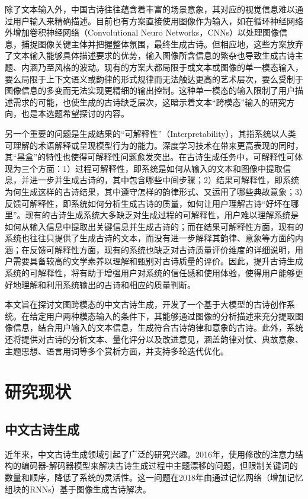 除了文本输入外，中国古诗往往蕴含着丰富的场景意象，其对应的视觉信息难以通过用户输入来精确描述。目前也有方案直接使用图像作为输入，如在循环神经网络外增加卷积神经网络（Convolutional Neuro Networks，CNNs）以处理图像信息，捕捉图像关键主体并把握整体氛围，最终生成古诗。\cite{liuImages2PoemGeneratingChinese2018}\cite{xuHowImagesInspire2018}但相应地，这些方案放弃了文本输入能够具体描述要求的优势，输入图像所含信息的繁杂也导致生成古诗主题、内涵乃至风格的波动。现有的方案大都局限于或文本或图像的单一模态输入，要么局限于上下文语义或韵律的形式规律而无法触达更高的艺术层次，要么受制于图像信息的多变而无法实现更精细的输出控制。这种单一模态的输入限制了用户描述需求的可能，也使生成的古诗缺乏层次，这暗示着文本“跨模态”输入的研究方向，也是本选题希望探讨的内容。

另一个重要的问题是生成结果的“可解释性”（Interpretability），其指系统以人类可理解的术语解释或呈现模型行为的能力。\cite{doshi-velezRigorousScienceInterpretable2017}深度学习技术在带来更高表现的同时，其“黑盒”的特性也使得可解释性问题愈发突出。在古诗生成任务中，可解释性可体现为三个方面：1）过程可解释性，即系统是如何从输入的文本和图像中提取信息，并进一步并生成古诗的，其中包含哪些中间步骤；2）结果可解释性，即系统为何生成这样的古诗结果，其中遵守怎样的韵律形式、又运用了哪些典故意象；3）反馈可解释性，即系统如何分析生成古诗的质量，如何让用户理解古诗“好坏在哪里”。现有的古诗生成系统大多缺乏对生成过程的可解释性，用户难以理解系统是如何从输入信息中提取出关键信息并生成古诗的；而在结果可解释性方面，现有的系统也往往只提供了生成古诗的文本，而没有进一步解释其韵律、意象等方面的内涵；在反馈可解释性方面，现有的系统也缺乏对古诗质量评价维度的详细说明，用户需要具备较高的文学素养以理解和甄别对古诗质量的评价。因此，提升古诗生成系统的可解释性，将有助于增强用户对系统的信任感和使用体验，使得用户能够更好地理解和利用系统输出的古诗和相应的质量判断。


本文旨在探讨文图跨模态的中文古诗生成，开发了一个基于大模型的古诗创作系统。在给定用户两种模态输入的条件下，其能够通过图像的分析描述来充分提取图像信息，结合用户输入的文本信息，生成符合古诗韵律和意象的古诗。此外，系统还将提供对古诗的分析文本、量化评分以及改进意见，涵盖韵律对仗、典故意象、主题思想、语言用词等多个赏析方面，并支持多轮迭代优化。

\section{研究现状}

\subsection{中文古诗生成}
近年来，中文古诗生成领域引起了广泛的研究兴趣。2016年，\cite{wangChinesePoetryGeneration2016}使用修改的注意力结构的编码器-解码器模型来解决古诗生成过程中主题漂移的问题，但限制关键词的数量和顺序，降低了系统的灵活性。这一问题在2018年由\cite{xuHowImagesInspire2018}通过记忆网络（增加记忆组块的RNNs）基于图像生成古诗解决。


